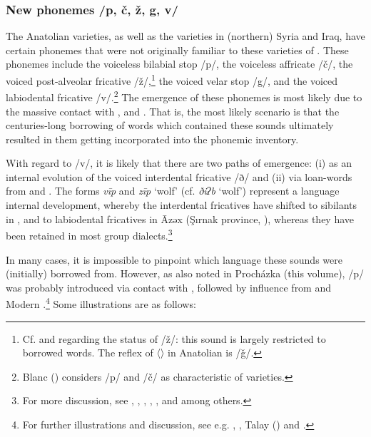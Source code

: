 \documentclass[output=paper]{langsci/langscibook}
\begin{document}
\subsubsection{New phonemes /p, \v{c}, ž, g, v/}\label{newsounds}
The Anatolian  varieties, as well as the varieties in (northern) Syria and Iraq, have certain phonemes that were not originally familiar to these varieties of . These phonemes include the voiceless bilabial stop /p/, the voiceless affricate /\v{c}/, the voiced post-alveolar fricative /ž/,\footnote{Cf. \cite{Jastrow2011anatolian} and \cite{GrigoreBituna2012} regarding the status of /ž/: this sound is largely restricted to borrowed words. The reflex of  〈{}〉 in Anatolian  is /\v{g}/.} the voiced velar stop /g/, and the voiced labiodental fricative /v/.\footnote{Blanc (\citeyear[6--7]{Blanc1964}) considers /p/ and /\v{c}/ as characteristic of  varieties.} The emergence of these phonemes is most likely due to the massive contact with ,  and . That is, the most likely scenario is that the centuries-long borrowing of words which contained these sounds ultimately resulted in them getting incorporated into the phonemic inventory.


With regard to /v/, it is likely that there are two paths of emergence: (i) as an internal evolution of the voiced interdental fricative /ð/ and (ii) via loan-words from  and . The forms \textit{vīp} and \textit{zīp} `wolf' (cf.  \textit{ðiʔb} `wolf') represent a language internal development, whereby the interdental fricatives have shifted to {sibilants} in , and to labiodental fricatives in Āzəx (Şırnak province, \citealt{Wittrich2001}), whereas they have been retained in most  group dialects.\footnote{For more discussion, see \citet{Wittrich2001}, \citet{Jastrow2011anatolian}, \citet{Grigore2007article}, \citet{Talay2011}, \citet{Akkus2017}, and \cite{Bituna2016} among others. }

In many cases, it is impossible to pinpoint which language these sounds were (initially) borrowed from. However, as also noted in Proch\'{a}zka (this volume), /p/ was probably introduced via contact with , followed by influence from  and Modern .\footnote{For further illustrations and discussion, see e.g. \citet{VockeWaldner1982}, \citet{Jastrow2011anatolian}, Talay (\citeyear{Talay2002,Talay2007}) and \citet{GrigoreBituna2012}.} Some illustrations are as follows:
\end{document}
